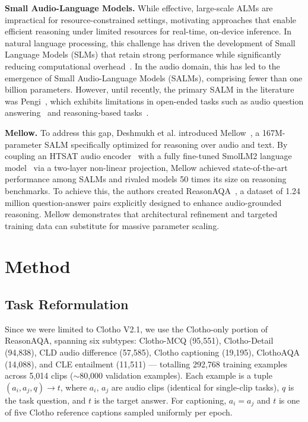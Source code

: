 \documentclass[cameraready]{Interspeech}
\begin{document}
\medskip
\noindent\textbf{Small Audio-Language Models.} While effective, large-scale ALMs are impractical for resource-constrained settings, motivating approaches that enable efficient reasoning under limited resources for real-time, on-device inference. In natural language processing, this challenge has driven the development of Small Language Models (SLMs) that retain strong performance while significantly reducing computational overhead~\cite{smollm2, abdin2024phi3, liu2024mobilellm}. In the audio domain, this has led to the emergence of Small Audio-Language Models (SALMs), comprising fewer than one billion parameters. However, until recently, the primary SALM in the literature was Pengi~\cite{deshmukh2023pengi}, which exhibits limitations in open-ended tasks such as audio question answering~\cite{gong2024listen} and reasoning-based tasks~\cite{deshmukh2024audio, deshmukh2025adiff, sakshi2024mmau}.

\medskip
\noindent\textbf{Mellow.} To address this gap, Deshmukh et al. introduced Mellow~\cite{mellow}, a 167M-parameter SALM specifically optimized for reasoning over audio and text. By coupling an HTSAT audio encoder~\cite{chen2022HTSAT} with a fully fine-tuned SmolLM2 language model~\cite{smollm2} via a two-layer non-linear projection, Mellow achieved state-of-the-art performance among SALMs and rivaled models 50 times its size on reasoning benchmarks. To achieve this, the authors created ReasonAQA~\cite{mellow}, a dataset of 1.24 million question-answer pairs explicitly designed to enhance audio-grounded reasoning. Mellow demonstrates that architectural refinement and targeted training data can substitute for massive parameter scaling.



\section{Method}
\label{sec:method}

\subsection{Task Reformulation}

Since we were limited to Clotho V2.1, we use the Clotho-only portion of ReasonAQA, spanning six subtypes: Clotho-MCQ (95,551), Clotho-Detail (94,838), CLD audio difference (57,585), Clotho captioning (19,195), ClothoAQA (14,088), and CLE entailment (11,511) — totalling 292,768 training examples across 5,014 clips ($\sim$80,000 validation examples). Each example is a tuple $(a_i, a_j, q) \to t$, where $a_i$, $a_j$ are audio clips (identical for single-clip tasks), $q$ is the task question, and $t$ is the target answer. For captioning, $a_i = a_j$ and $t$ is one of five Clotho reference captions sampled uniformly per epoch.
\end{document}
